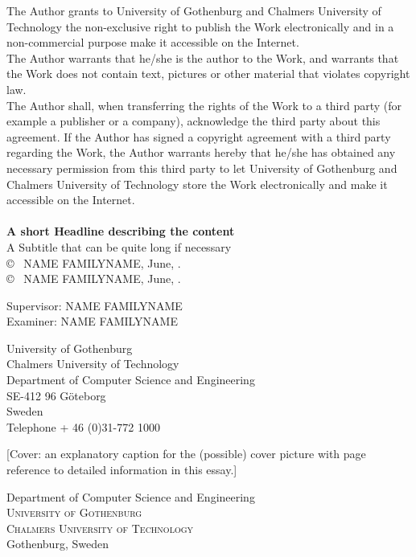 \documentclass[12pt,a4paper,twoside,openright]{report}
\newcommand{\backgroundpic}[3]{
	\put(#1,#2){
	\parbox[b][\paperheight]{\paperwidth}{
	\centering
	\texttt{[image: \#3]}}}}
\begin{document}
\newpage
\AddToShipoutPicture*{\backgroundpic{-4}{56.7}{frontpage_gu_eng_vec_m2.pdf}}
\addtolength{\voffset}{2cm}
\thispagestyle{empty}
The Author grants to University of Gothenburg and Chalmers University of Technology the non-exclusive right to publish the Work electronically and in a non-commercial purpose make it accessible on the Internet.\\
The Author warrants that he/she is the author to the Work, and warrants that the Work does not contain text, pictures or other material that violates copyright law. \\

The Author shall, when transferring the rights of the Work to a third party (for example a publisher or a company), acknowledge the third party about this agreement. If the Author has signed a copyright agreement with a third party regarding the Work, the Author warrants hereby that he/she has obtained any necessary permission from this third party to let University of Gothenburg and Chalmers University of Technology store the Work electronically and make it accessible on the Internet.\\ \\

\textbf{A short Headline describing the content}\\
A Subtitle that can be quite long if necessary\\

\copyright ~ NAME FAMILYNAME, June, \the\year. \setlength{\parskip}{1cm} \\
\copyright ~ NAME FAMILYNAME, June, \the\year. \setlength{\parskip}{1cm}

Supervisor: NAME FAMILYNAME\\
Examiner: NAME FAMILYNAME \setlength{\parskip}{1cm}


University of Gothenburg\\
Chalmers University of Technology\\
Department of Computer Science and Engineering\\
SE-412 96 G{\"o}teborg\\
Sweden\\
Telephone + 46 (0)31-772 1000 \setlength{\parskip}{0.5cm}

[Cover:
an explanatory caption for the (possible) cover picture
with page reference to detailed information in this essay.] \setlength{\parskip}{3cm}

Department of Computer Science and Engineering \\
\textsc{University of Gothenburg} \\
\textsc{Chalmers University of Technology} \\
Gothenburg, Sweden \the\year
\end{document}
